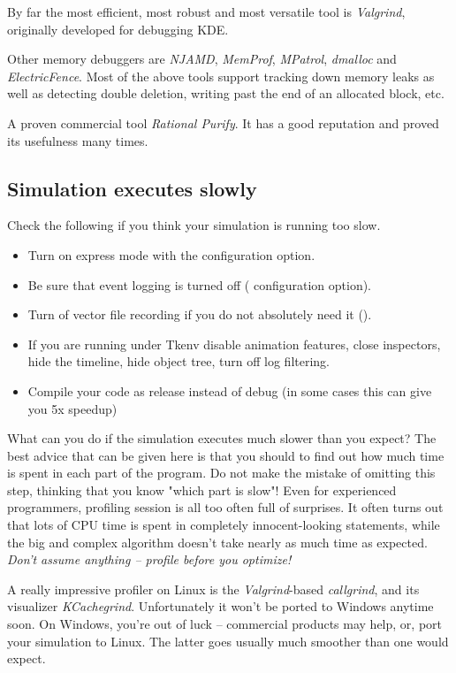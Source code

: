 By far the most efficient, most robust and most versatile tool
is \textit{Valgrind}, originally developed for debugging KDE.

Other memory debuggers are \textit{NJAMD}, \textit{MemProf},
\textit{MPatrol}, \textit{dmalloc} and \textit{ElectricFence}.
Most of the above tools support tracking down memory leaks as well as
detecting double deletion, writing past the end of an allocated block, etc.

A proven commercial tool \textit{Rational Purify}. It has
a good reputation and proved its usefulness many times.

\subsection{Simulation executes slowly}

Check the following if you think your simulation is running too slow.

\begin{itemize}
  \item Turn on express mode with the  configuration option.
  \item Be sure that event logging is turned off ( configuration option).
  \item Turn of vector file recording if you do not absolutely need it ().
  \item If you are running under Tkenv disable animation features, close inspectors,
        hide the timeline, hide object tree, turn off log filtering.
  \item Compile your code as release instead of debug (in some cases this can give you 5x speedup)
\end{itemize}


What can you do if the simulation executes much slower than you expect?
The best advice that can be given here is that you should
 to find out how much time is spent in each
part of the program. Do not make the mistake of omitting this step,
thinking that you know "which part is slow"! Even for experienced
programmers, profiling session is all too often full of surprises.
It often turns out that lots of CPU time is spent in completely
innocent-looking statements, while the big and complex algorithm
doesn't take nearly as much time as expected. \textit{Don't assume anything
-- profile before you optimize!}

A really impressive profiler on Linux is the \textit{Valgrind}-based
\textit{callgrind}, and its visualizer \textit{KCachegrind}.
Unfortunately it won't be ported to Windows anytime soon.
On Windows, you're out of luck -- commercial products may help, or,
port your simulation to Linux. The latter goes usually much smoother
than one would expect.



